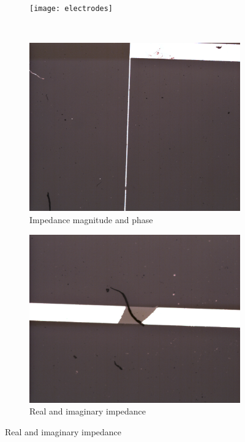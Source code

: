 \begin{figure}[h]
    \begin{subfigure}
        \centering
        \texttt{[image: electrodes]}
    \end{subfigure}
    \\
    \vspace{0.1 in}
    \centering
    \begin{subfigure}[b]{0.45\textwidth}
        \centering
        \includegraphics[width=\textwidth]{images/electrodeFailureChunkBreak.png}
        \caption{Impedance magnitude and phase}
    \end{subfigure}
    \hfill
    \begin{subfigure}[b]{0.45\textwidth}
        \centering
        \includegraphics[width=\textwidth]{images/electrodeFailureChunkBreakZoomed.png}
        \caption{Real and imaginary impedance}
    \end{subfigure}
\end{figure}


